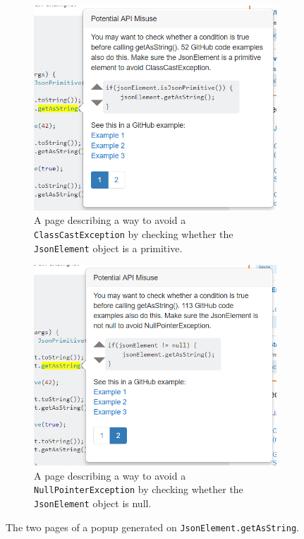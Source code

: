\begin{figure}
\centering
  \begin{subfigure}[a]{0.48\textwidth}
  \includegraphics[width=\textwidth]{json_ex2.PNG}
  \caption{A page describing a way to avoid a {\tt ClassCastException} by checking whether the {\tt JsonElement} object is a primitive.} 
  \vspace{.1in}
  \label{fig:page1}
  \end{subfigure}
  \hfill
  \begin{subfigure}[b]{0.48\textwidth}
  \includegraphics[width=\textwidth]{json_ex3.PNG}
  \caption{A page describing a way to avoid a {\tt NullPointerException} by checking whether the {\tt JsonElement} object is null.}
  \vspace{.1in}
  \label{fig:page2}
  \end{subfigure}
  \hfill
\caption{The two pages of a popup generated on {\tt JsonElement.getAsString}.}
\label{fig:features}
\end{figure}

